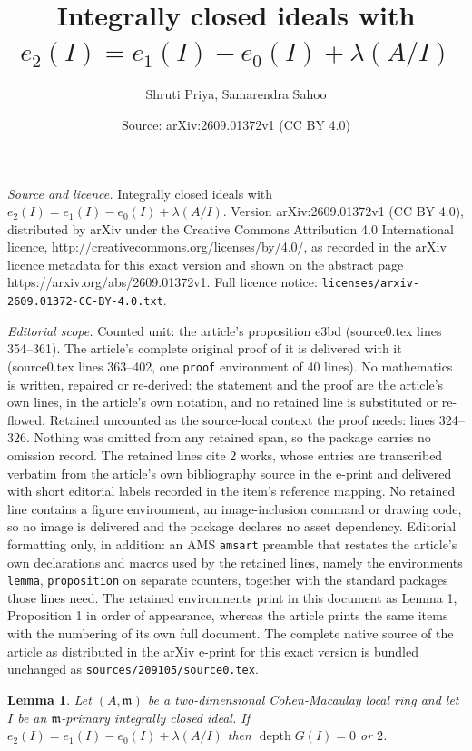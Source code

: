 \documentclass[10pt,a4paper]{amsart}
\title{Integrally closed ideals with $e_{2}(I)=e_{1}(I)-e_{0}(I)+\lambda(A/I)$}
\author{Shruti Priya, Samarendra Sahoo}
\date{Source: arXiv:2609.01372v1 (CC BY 4.0)}
\newtheorem{lemma}{Lemma}
\newcommand{\depth}{\operatorname{depth}}
\newcommand{\m}{\mathfrak{m}}
\begin{document}
\maketitle

\noindent\emph{Source and licence.} Integrally closed ideals with $e_{2}(I)=e_{1}(I)-e_{0}(I)+\lambda(A/I)$. Version arXiv:2609.01372v1 (CC BY 4.0), distributed by arXiv under the Creative Commons Attribution 4.0 International licence, http://creativecommons.org/licenses/by/4.0/, as recorded in the arXiv licence metadata for this exact version and shown on the abstract page https://arxiv.org/abs/2609.01372v1. Full licence notice: \texttt{licenses/arxiv-2609.01372-CC-BY-4.0.txt}.\par\smallskip

\noindent\textit{Editorial scope.} Counted unit: the article's proposition e3bd (source0.tex lines 354--361). The article's complete original proof of it is delivered with it (source0.tex lines 363--402, one \texttt{proof} environment of 40 lines). No mathematics is written, repaired or re-derived: the statement and the proof are the article's own lines, in the article's own notation, and no retained line is substituted or re-flowed.  Retained uncounted as the source-local context the proof needs: lines 324--326.  Nothing was omitted from any retained span, so the package carries no omission record.  The retained lines cite 2 works, whose entries are transcribed verbatim from the article's own bibliography source in the e-print and delivered with short editorial labels recorded in the item's reference mapping.  No retained line contains a figure environment, an image-inclusion command or drawing code, so no image is delivered and the package declares no asset dependency.  Editorial formatting only, in addition: an AMS \texttt{amsart} preamble that restates the article's own declarations and macros used by the retained lines, namely the environments \texttt{lemma}, \texttt{proposition} on separate counters, together with the standard packages those lines need.  The retained environments print in this document as Lemma 1, Proposition 1 in order of appearance, whereas the article prints the same items with the numbering of its own full document.  The complete native source of the article as distributed in the arXiv e-print for this exact version is bundled unchanged as \texttt{sources/209105/source0.tex}.
\begin{lemma} \label{lemma4.4}
    Let $(A,\m)$ be a two-dimensional Cohen-Macaulay local ring and let $I$ be an $\m$-primary integrally closed ideal. If $e_{2}(I)=e_{1}(I)-e_{0}(I)+\lambda(A/I)$  then $\depth G(I)=0$ or $2$.
\end{lemma}
\end{document}
